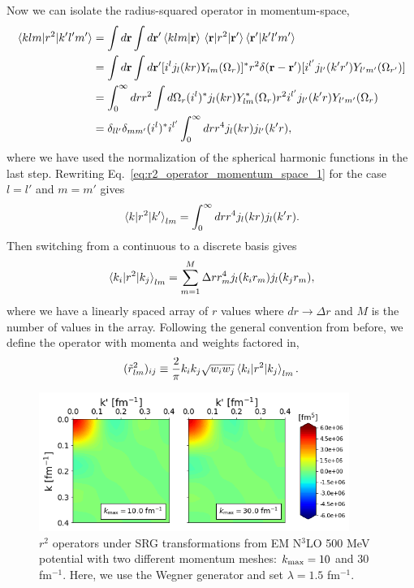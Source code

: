 \documentclass[preprintnumbers,floatfix,aps,prc,preprint,nofootinbib]{revtex4-1}
\begin{document}
Now we can isolate the radius-squared operator in momentum-space,
%
\begin{align}
    \label{eq:r2_operator_momentum_space_1}
    \mel{klm}{r^2}{k'l'm'} &= \int d\mathbf{r} \int d\mathbf{r'} \bra{klm} \ket{\mathbf{r}} \mel{\mathbf{r}}{r^2}{\mathbf{r'}} \bra{\mathbf{r'}} \ket{k'l'm'} \nonumber \\
    &= \int d\mathbf{r} \int d\mathbf{r'} [i^l j_l(kr) Y_{lm}(\Omega_r)]^* r^2 \delta(\mathbf{r}-\mathbf{r'}) [i^{l'} j_{l'}(k'r') Y_{l'm'}(\Omega_{r'})] \nonumber \\
    &= \int_0^{\infty} dr r^2 \int d\Omega_r (i^l)^* j_l(kr) Y_{lm}^*(\Omega_r) r^2 i^{l'} j_{l'}(k'r) Y_{l'm'}(\Omega_r) \nonumber \\
    &= \delta_{ll'} \delta_{mm'} (i^l)^* i^{l'} \int_0^{\infty} dr r^4 j_l(kr) j_{l'}(k'r),
\end{align}
%
where we have used the normalization of the spherical harmonic functions in the last step.
Rewriting Eq.~\eqref{eq:r2_operator_momentum_space_1} for the case $l=l'$ and $m=m'$ gives
%
\begin{align}
    \label{eq:r2_operator_momentum_space_2}
    \mel{k}{r^2}{k'}_{lm} = \int_0^{\infty} dr r^4 j_l(kr) j_{l}(k'r).
\end{align}
%
Then switching from a continuous to a discrete basis gives
%
\begin{align}
    \label{eq:r2_operator_momentum_space_3}
    \mel{k_i}{r^2}{k_j}_{lm} = \sum_{m=1}^M \Delta r r_m^4 j_l(k_i r_m) j_{l}(k_j r_m),
\end{align}
%
where we have a linearly spaced array of $r$ values where $dr \rightarrow \Delta r$ and $M$ is the number of values in the array.
Following the general convention from before, we define the operator with momenta and weights factored in,
%
\begin{align}
    \label{eq:r2_operator_momentum_space_with_factors}
    (\tilde{r}_{lm}^2)_{ij} \equiv \frac{2}{\pi} k_i k_j \sqrt{w_i w_j} \mel{k_i}{r^2}{k_j}_{lm}.
\end{align}
%
\begin{figure}[tbh]
    \includegraphics[clip,clip,width=0.9\textwidth]{r2_operator_test.png}%
    \caption{$r^2$ operators under SRG transformations from EM N$^3$LO 500 MeV potential with two different momentum meshes: $k_{\rm max}=10$ and $30$ fm$^{-1}$. Here, we use the Wegner generator and set $\lambda=1.5$ fm$^{-1}$.}
    \label{fig:r2_operators}
\end{figure}
%




\end{document}
